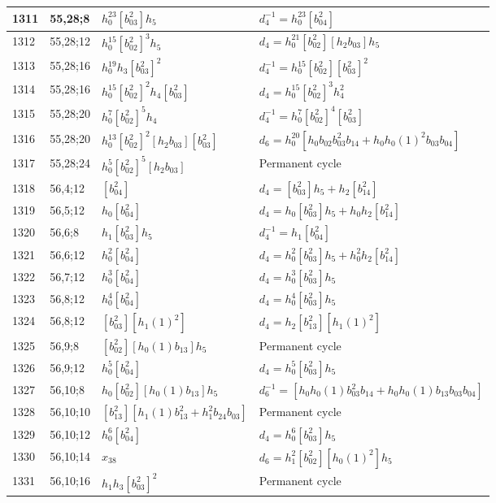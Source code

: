 \documentclass{article}
\begin{document}
\begin{longtable}{|l|l|>{\raggedright\arraybackslash}p{6cm}|>{\raggedright\arraybackslash}p{6cm}|}
\hline
1311 & 55,28;8 & $h_0^{23}[b_{03}^2]h_5$ & $d_{4}^{-1}=h_0^{23}[b_{04}^2]$\\
\hline
1312 & 55,28;12 & $h_0^{15}[b_{02}^2]^3h_5$ &$d_{4}=h_0^{21}[b_{02}^2][h_2b_{03}]h_5$\\
\hline
1313 & 55,28;16 & $h_0^{19}h_3[b_{03}^2]^2$ & $d_{4}^{-1}=h_0^{15}[b_{02}^2][b_{03}^2]^2$\\
1314 & 55,28;16 & $h_0^{15}[b_{02}^2]^2h_4[b_{03}^2]$ &$d_{4}=h_0^{15}[b_{02}^2]^3h_4^2$\\
\hline
1315 & 55,28;20 & $h_0^7[b_{02}^2]^5h_4$ & $d_{4}^{-1}=h_0^7[b_{02}^2]^4[b_{03}^2]$\\
1316 & 55,28;20 & $h_0^{13}[b_{02}^2]^2[h_2b_{03}][b_{03}^2]$ &$d_{6}=h_0^{20}[h_0b_{02}b_{03}^2b_{14} + h_0h_0(1)^2b_{03}b_{04}]$\\
\hline
1317 & 55,28;24 & $h_0^5[b_{02}^2]^5[h_2b_{03}]$ & Permanent cycle\\
\hline
1318 & 56,4;12 & $[b_{04}^2]$ &$d_{4}=[b_{03}^2]h_5 + h_2[b_{14}^2]$\\
\hline
1319 & 56,5;12 & $h_0[b_{04}^2]$ &$d_{4}=h_0[b_{03}^2]h_5 + h_0h_2[b_{14}^2]$\\
\hline
1320 & 56,6;8 & $h_1[b_{03}^2]h_5$ & $d_{4}^{-1}=h_1[b_{04}^2]$\\
\hline
1321 & 56,6;12 & $h_0^2[b_{04}^2]$ &$d_{4}=h_0^2[b_{03}^2]h_5 + h_0^2h_2[b_{14}^2]$\\
\hline
1322 & 56,7;12 & $h_0^3[b_{04}^2]$ &$d_{4}=h_0^3[b_{03}^2]h_5$\\
\hline
1323 & 56,8;12 & $h_0^4[b_{04}^2]$ &$d_{4}=h_0^4[b_{03}^2]h_5$\\
1324 & 56,8;12 & $[b_{03}^2][h_1(1)^2]$ &$d_{4}=h_2[b_{13}^2][h_1(1)^2]$\\
\hline
1325 & 56,9;8 & $[b_{02}^2][h_0(1)b_{13}]h_5$ & Permanent cycle\\
\hline
1326 & 56,9;12 & $h_0^5[b_{04}^2]$ &$d_{4}=h_0^5[b_{03}^2]h_5$\\
\hline
1327 & 56,10;8 & $h_0[b_{02}^2][h_0(1)b_{13}]h_5$ & $d_{6}^{-1}=[h_0h_0(1)b_{03}^2b_{14} + h_0h_0(1)b_{13}b_{03}b_{04}]$\\
\hline
1328 & 56,10;10 & $[b_{13}^2][h_1(1)b_{13}^2 + h_1^2b_{24}b_{03}]$ & Permanent cycle\\
\hline
1329 & 56,10;12 & $h_0^6[b_{04}^2]$ &$d_{4}=h_0^6[b_{03}^2]h_5$\\
\hline
1330 & 56,10;14 & $x_{38}$ &$d_{6}=h_1^2[b_{02}^2][h_0(1)^2]h_5$\\
\hline
1331 & 56,10;16 & $h_1h_3[b_{03}^2]^2$ & Permanent cycle\\

\end{longtable}
\end{document}

